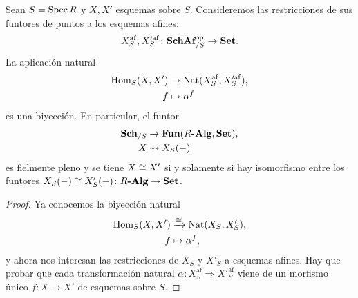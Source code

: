 \documentclass{article}
\numberwithin{equation}{section}
\theoremstyle{definition}
\begin{document}
\begin{teorema}
  Sean $S = \operatorname{Spec} R$ y $X,X'$ esquemas sobre $S$. Consideremos las restricciones
  de sus funtores de puntos a los esquemas afines:
  $$X_S^\mathrm{af}, X'^{\mathrm{af}}_S\colon \text{\bf SchAf}_{/S}^\mathrm{op} \to \text{\bf Set}.$$
  La aplicación natural
  \begin{align*}
    \operatorname{Hom}_S (X,X') & \to \operatorname{Nat} (X_S^\mathrm{af}, X'^{\mathrm{af}}_S),\\
    f & \mapsto \alpha^f
  \end{align*}
  es una biyección. En particular, el funtor
  \begin{align*}
    \text{\bf Sch}_{/S} & \to \text{\bf Fun} (R\text{\bf -Alg}, \text{\bf Set}),\\
    X & \rightsquigarrow X_S (-)
  \end{align*}
  es fielmente pleno y se tiene $X \cong X'$ si y solamente si hay isomorfismo
  entre los funtores
  ${X_S (-) \cong X'_S (-)\colon R\text{\bf -Alg} \to \text{\bf Set}}$.

  \begin{proof}
    Ya conocemos la biyección natural
    \begin{align*}
      \operatorname{Hom}_S (X,X') & \xrightarrow{\cong} \operatorname{Nat} (X_S, X'_S),\\
      f & \mapsto \alpha^f,
    \end{align*}
    y ahora nos interesan las restricciones de $X_S$ y $X'_S$ a esquemas
    afines. Hay que probar que cada transformación natural
    $\alpha\colon X_S^\mathrm{af} \Rightarrow X'^{\mathrm{af}}_S$ viene de
    un morfismo único $f\colon X\to X'$ de esquemas sobre $S$.


\end{proof}
\end{teorema}
\end{document}
